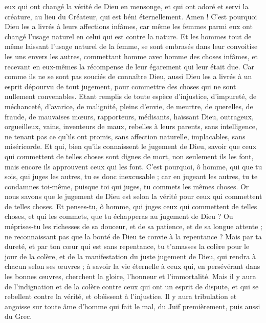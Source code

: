 \begin{multicols}{2}
eux qui ont changé la vérité de Dieu en mensonge, et qui ont adoré et servi la créature, au lieu du Créateur, qui est béni éternellement. Amen !
C'est pourquoi Dieu les a livrés à leurs affections infâmes, car même les femmes parmi eux ont changé l'usage naturel en celui qui est contre la nature.
Et les hommes tout de même laissant l’usage naturel de la femme, se sont embrasés dans leur convoitise les uns envers les autres, commettant homme avec homme des choses infâmes, et recevant en eux-mêmes la récompense de leur égarement qui leur était due.
Car comme ils ne se sont pas souciés de connaître Dieu, aussi Dieu les a livrés à un esprit dépourvu de tout jugement, pour commettre des choses qui ne sont nullement convenables.
Etant remplis de toute espèce d’injustice, d'impureté, de méchanceté, d'avarice, de malignité, pleins d'envie, de meurtre, de querelles, de fraude, de mauvaises mœurs,
rapporteurs, médisants, haïssant Dieu, outrageux, orgueilleux, vains, inventeurs de maux, rebelles à leurs parents,
sans intelligence, ne tenant pas ce qu’ils ont promis, sans affection naturelle, implacables, sans miséricorde.
Et qui, bien qu'ils connaissent le jugement de Dieu, savoir que ceux qui commettent de telles choses sont dignes de mort, non seulement ils les font, mais encore ils approuvent ceux qui les font.
\VerseOne{}C'est pourquoi, ô homme, qui que tu sois, qui juges les autres, tu es donc inexcusable ; car en jugeant les autres, tu te condamnes toi-même, puisque toi qui juges, tu commets les mêmes choses.
Or nous savons que le jugement de Dieu est selon la vérité pour ceux qui commettent de telles choses.
Et penses-tu, ô homme, qui juges ceux qui commettent de telles choses, et qui les commets, que tu échapperas au jugement de Dieu ?
Ou méprises-tu les richesses de sa douceur, et de sa patience, et de sa longue attente ; ne reconnaissant pas que la bonté de Dieu te convie à la repentance ?
Mais par ta dureté, et par ton cœur qui est sans repentance, tu t'amasses la colère pour le jour de la colère, et de la manifestation du juste jugement de Dieu,
qui rendra à chacun selon ses œuvres ;
à savoir la vie éternelle à ceux qui, en persévérant dans les bonnes œuvres, cherchent la gloire, l'honneur et l'immortalité.
Mais il y aura de l'indignation et de la colère contre ceux qui ont un esprit de dispute, et qui se rebellent contre la vérité, et obéissent à l'injustice.
Il y aura tribulation et angoisse sur toute âme d'homme qui fait le mal, du Juif premièrement, puis aussi du Grec.

\end{multicols}
